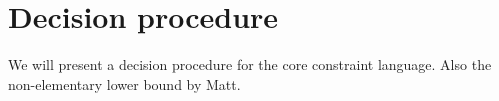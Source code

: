 
\section{Decision procedure}\label{sec-dec}

We will present a decision procedure for the core constraint language. Also the non-elementary lower bound by Matt.